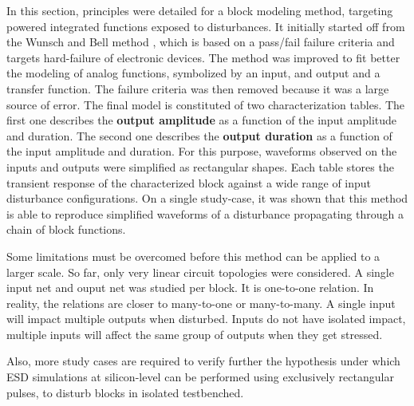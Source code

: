 In this section, principles were detailed for a block modeling method, targeting powered integrated functions exposed to disturbances.
It initially started off from the Wunsch and Bell method \cite{wunsch-bell}, which is based on a pass/fail failure criteria and targets hard-failure of electronic devices.
The method was improved to fit better the modeling of analog functions, symbolized by an input, and output and a transfer function.
The failure criteria was then removed because it was a large source of error.
The final model is constituted of two characterization tables.
The first one describes the \textbf{output amplitude} as a function of the input amplitude and duration.
The second one describes the \textbf{output duration} as a function of the input amplitude and duration.
For this purpose, waveforms observed on the inputs and outputs were simplified as rectangular shapes.
Each table stores the transient response of the characterized block against a wide range of input disturbance configurations.
On a single study-case, it was shown that this method is able to reproduce simplified waveforms of a disturbance propagating through a chain of block functions.

Some limitations must be overcomed before this method can be applied to a larger scale.
So far, only very linear circuit topologies were considered.
A single input net and ouput net was studied per block.
It is one-to-one relation.
In reality, the relations are closer to many-to-one or many-to-many.
A single input will impact multiple outputs when disturbed.
Inputs do not have isolated impact, multiple inputs will affect the same group of outputs when they get stressed.

Also, more study cases are required to verify further the hypothesis under which ESD simulations at silicon-level can be performed using exclusively rectangular pulses, to disturb blocks in isolated testbenched.

